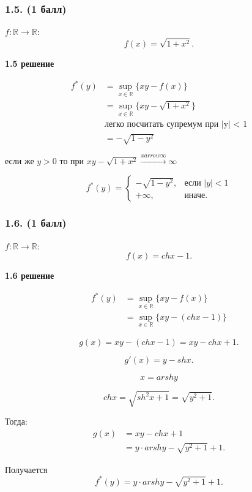 \documentclass[12pt]{article}
\begin{document}
\subsubsection*{1.5. (1 балл)}
$ f : \mathbb{R} \to \mathbb{R} $: 
$$
f(x) = \sqrt{1 + x^2}.
$$

\textbf{1.5 решение}

$$
\begin{aligned}
    f^*(y)
    &= \sup_{x \in \mathbb{R}} \{ x y - f(x) \} \\
    &= \sup_{x \in \mathbb{R}} \{ x y - \sqrt{1 + x^2} \} \\
    & \text{легко посчитать супремум при |y| < 1} \\
    &= - \sqrt{1 - y^2}
\end{aligned}
$$

если же $y > 0$  то при $ x y - \sqrt{1 + x^2} \xrightarrow{{x  arrow \infty}} \infty $

$$
f^*(y) = 
\begin{cases} 
- \sqrt{1 - y^2}, & \text{если } |y| < 1 \\
+\infty, & \text{иначе}.
\end{cases}
$$


\subsubsection*{1.6. (1 балл)}
$ f : \mathbb{R} \to \mathbb{R} $: 
$$
f(x) = ch x - 1.
$$

\textbf{1.6 решение}


$$
\begin{aligned}
    f^*(y)
    &= \sup_{x \in \mathbb{R}} \{ x y - f(x) \} \\
    &= \sup_{x \in \mathbb{R}} \{x y - ( ch x - 1) \}
\end{aligned}
$$

$$
g(x) = x y - (ch x - 1) = x y - ch x + 1.
$$

$$
g'(x) = y - sh x.
$$

$$
x = arsh y
$$

$$
ch x = \sqrt{sh^2 x + 1} = \sqrt{y^2 + 1}.
$$

Тогда:
$$
\begin{aligned}
g(x) &= x y - ch x + 1 \\
&= y \cdot arsh y - \sqrt{y^2 + 1} + 1.
\end{aligned}
$$

Получается
$$
f^*(y) = y \cdot arsh y - \sqrt{y^2 + 1} + 1.
$$
\end{document}
